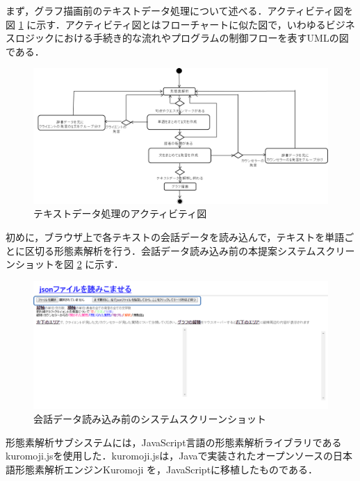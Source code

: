 \documentclass[shuuron]{kuee}
\begin{document}
まず，グラフ描画前のテキストデータ処理について述べる．アクティビティ図を図
\ref{fig:activity}
に示す．アクティビティ図とはフローチャートに似た図で，いわゆるビジネスロジックにおける手続き的な流れやプログラムの制御フローを表すUMLの図である．
\begin{figure}
  \begin{center}
    \includegraphics[width=\linewidth]{activity.png}
  \end{center}
  \caption{テキストデータ処理のアクティビティ図}
  \label{fig:activity}
\end{figure}


初めに，ブラウザ上で各テキストの会話データを読み込んで，テキストを単語ごとに区切る形態素解析を行う．会話データ読み込み前の本提案システムスクリーンショットを図
\ref{fig:yomikomimae2}
に示す．
\begin{figure}
  \begin{center}
    \includegraphics[width=\linewidth]{yomikomimae2.png}
  \end{center}
  \caption{会話データ読み込み前のシステムスクリーンショット}
  \label{fig:yomikomimae2}
\end{figure}
形態素解析サブシステムには，JavaScript言語の形態素解析ライブラリであるkuromoji.js\cite{kuromojijs}を使用した．kuromoji.jsは，Javaで実装されたオープンソースの日本語形態素解析エンジンKuromoji
\cite{kuromoji}
を，JavaScriptに移植したものである．
\end{document}
